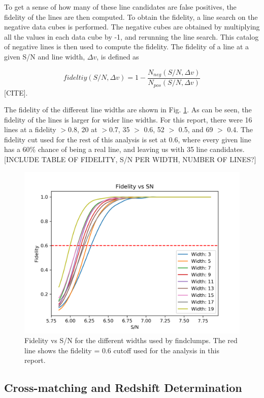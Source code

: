 To get a sense of how many of these line candidates are false positives, the fidelity of the lines are then computed. To obtain the fidelity, a line search on the negative data cubes is performed. The negative cubes are obtained by multiplying all the values in each data cube by -1, and rerunning the line search. This catalog of negative lines is then used to compute the fidelity. The fidelity of a line at a given S/N and line width, $\Delta v$, is defined as 

$$ fideltiy(S/N, \Delta v) = 1 - \frac{N_{neg}(S/N, \Delta v)}{N_{pos}(S/N, \Delta v)} $$ [CITE].

The fidelity of the different line widths are shown in Fig. \ref{fig:Fid_map}. As can be seen, the fidelity of the lines is larger for wider line widths. For this report, there were 16 lines at a fidelity $>$0.8, 20 at $>$0.7, 35 $>$ 0.6, 52 $>$ 0.5, and 69 $>$ 0.4. The fidelity cut used for the rest of this analysis is set at 0.6, where every given line has a 60\% chance of being a real line, and leaving us with 35 line candidates. [INCLUDE TABLE OF FIDELITY, S/N PER WIDTH, NUMBER OF LINES?]

\begin{figure}[tbp]
\centering \includegraphics[width=120mm]{Fidelity_map.png}
\caption{Fidelity vs S/N for the different widths used by findclumps. The red line shows the fidelity = 0.6 cutoff used for the analysis in this report.}
\label{fig:Fid_map}
\end{figure}

\subsection{Cross-matching and Redshift Determination}


